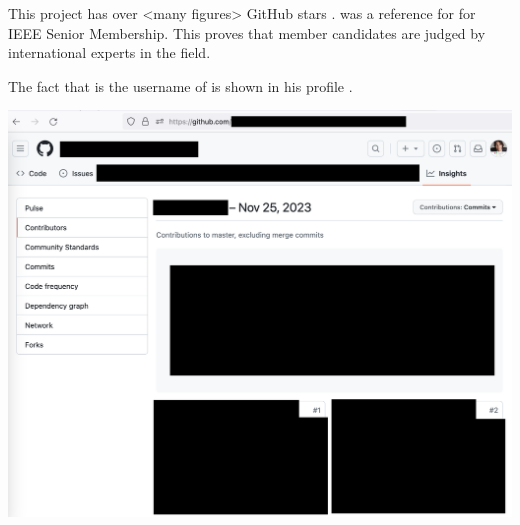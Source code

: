 
This project has over <many figures> GitHub stars .
\MrIeeeReferenceOne was a reference for \mrl for IEEE Senior Membership.
This proves that member candidates are judged by international experts in the field.

The fact that  is the username of \MrIeeeReferenceOne
is shown in his profile .

\includegraphics[width=\textwidth]{ieee-reference-one-project-two-contributors_public}

\pagebreak
